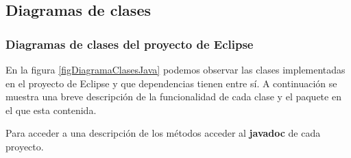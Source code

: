 \subsection{Diagramas de clases}
\subsubsection{Diagramas de clases del proyecto de Eclipse}

En la figura \ref{figDiagramaClasesJava} podemos observar las clases implementadas en el proyecto de Eclipse y que dependencias tienen entre sí. A continuación se muestra una breve descripción de la funcionalidad de cada clase y el paquete en el que esta contenida.

Para acceder a una descripción de los métodos acceder al \textbf{javadoc} de cada proyecto.

